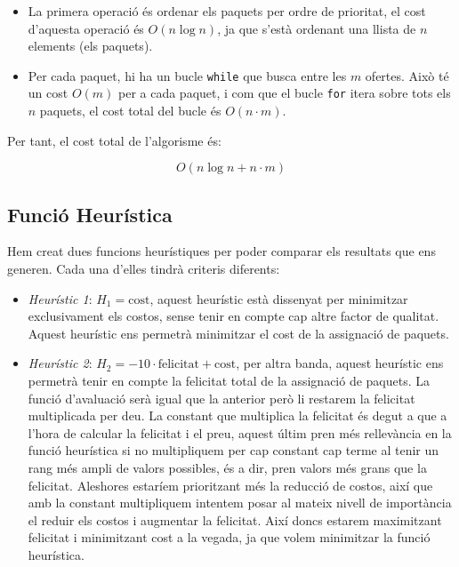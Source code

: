 \documentclass[a4paper]{article}
\begin{document}
	\begin{itemize}
		\item La primera operació és ordenar els paquets per ordre de prioritat, el cost d'aquesta operació és $O(n \log n)$, ja que s'està ordenant una llista de $n$ elements (els paquets).
		\item Per cada paquet, hi ha un bucle \texttt{while} que busca entre les $m$ ofertes. Això té un cost $O(m)$ per a cada paquet, i com que el bucle \texttt{for} itera sobre tots els $n$ paquets, el cost total del bucle és $O(n \cdot m)$.
	\end{itemize}
	
	Per tant, el cost total de l'algorisme és:
	
	\[
	O(n \log n + n \cdot m)
	\]
		
	\subsection{Funció Heurística}
	
	Hem creat dues funcions heurístiques per poder comparar els resultats que ens generen. Cada una d'elles tindrà criteris diferents:
	
	\begin{itemize}
		\item \emph{Heurístic 1}: $H_1 = \text{cost}$, aquest heurístic està dissenyat per minimitzar exclusivament els costos, sense tenir en compte cap altre factor de qualitat. Aquest heurístic ens permetrà minimitzar el cost de la assignació de paquets.
		\item \emph{Heurístic 2}: $H_2 = -10 \cdot \text{felicitat} + \text{cost}$, per altra banda, aquest heurístic ens permetrà tenir en compte la felicitat total de la assignació de paquets. La funció d'avaluació serà igual que la anterior però li restarem la felicitat multiplicada per deu. La constant que multiplica la felicitat és degut a que a l'hora de calcular la felicitat i el preu, aquest últim pren més rellevància en la funció heurística si no multipliquem per cap constant cap terme al tenir un rang més ampli de valors possibles, és a dir, pren valors més grans que la felicitat. Aleshores estaríem prioritzant més la reducció de costos, així que amb la constant multipliquem intentem posar al mateix nivell de importància el reduir els costos i augmentar la felicitat. Així doncs estarem maximitzant felicitat i minimitzant cost a la vegada, ja que volem minimitzar la funció heurística.
	\end{itemize}
	
\end{document}
